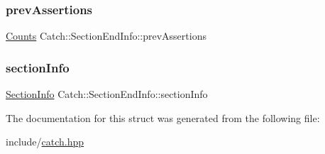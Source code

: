\subsubsection{\texorpdfstring{prevAssertions}{prevAssertions}}
{\footnotesize\ttfamily \mbox{\hyperlink{struct_catch_1_1_counts}{Counts}} Catch\+::\+Section\+End\+Info\+::prev\+Assertions}

\mbox{\label{struct_catch_1_1_section_end_info_a2d44793392cb83735d086d726822abe9}} 
\subsubsection{\texorpdfstring{sectionInfo}{sectionInfo}}
{\footnotesize\ttfamily \mbox{\hyperlink{struct_catch_1_1_section_info}{Section\+Info}} Catch\+::\+Section\+End\+Info\+::section\+Info}



The documentation for this struct was generated from the following file\+:\begin{DoxyCompactItemize}
\item 
include/\mbox{\hyperlink{catch_8hpp}{catch.\+hpp}}\end{DoxyCompactItemize}

